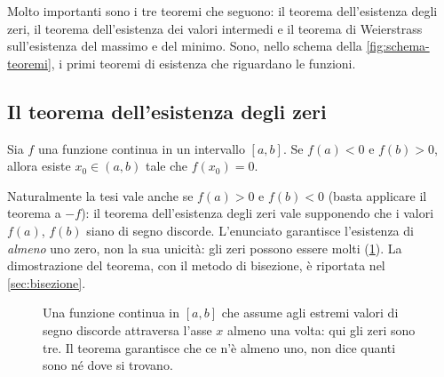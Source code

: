 Molto importanti sono i tre teoremi che seguono: il teorema dell'esistenza degli zeri,
il teorema dell'esistenza dei valori intermedi e il teorema di Weierstrass sull'esistenza
del massimo e del minimo. Sono, nello schema della \cref{fig:schema-teoremi}, i primi
teoremi di esistenza che riguardano le funzioni.

\subsection{Il teorema dell'esistenza degli zeri}

\begin{teorema}\label{teo:zeri}
Sia $f$ una funzione continua in un intervallo $[a,b]$. Se $f(a)<0$ e $f(b)>0$, allora
esiste $x_{0}\in(a,b)$ tale che $f(x_{0})=0$.
\end{teorema}

\begin{schema}
\end{schema}

Naturalmente la tesi vale anche se $f(a)>0$ e $f(b)<0$ (basta applicare il teorema a
$-f$): il teorema dell'esistenza degli zeri vale supponendo che i valori $f(a)$, $f(b)$
siano di segno discorde. L'enunciato garantisce l'esistenza di \emph{almeno} uno zero,
non la sua unicità: gli zeri possono essere molti (\cref{fig:zeri}). La dimostrazione
del teorema, con il metodo di bisezione, è riportata nel \cref{sec:bisezione}.

\begin{figure}[htb]
\centering
{}
\caption{Una funzione continua in $[a,b]$ che assume agli estremi valori di segno
discorde attraversa l'asse $x$ almeno una volta: qui gli zeri sono tre. Il teorema
garantisce che ce n'è almeno uno, non dice quanti sono né dove si trovano.}
\label{fig:zeri}
\end{figure}

